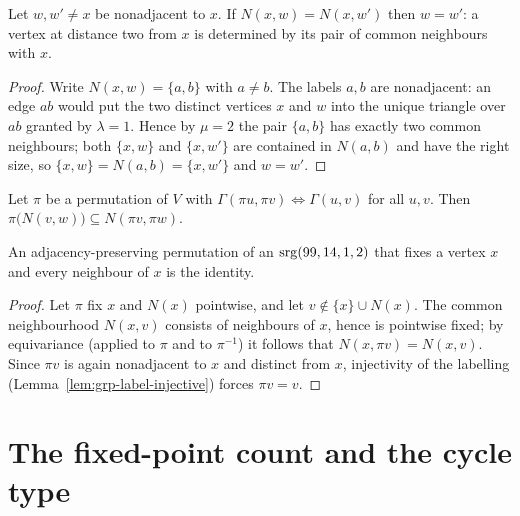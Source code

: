 \begin{lemma}\label{lem:grp-label-injective}
Let $w, w' \ne x$ be nonadjacent to $x$.  If $N(x,w) = N(x,w')$ then
$w = w'$: a vertex at distance two from $x$ is determined by its pair of
common neighbours with $x$.
\leanok
{}
\end{lemma}

\begin{proof}\leanok
{}
Write $N(x,w) = \{a,b\}$ with $a \ne b$.  The labels $a, b$ are nonadjacent:
an edge $ab$ would put the two distinct vertices $x$ and $w$ into the unique
triangle over $ab$ granted by $\lambda = 1$.  Hence by $\mu = 2$ the pair
$\{a,b\}$ has exactly two common neighbours; both $\{x,w\}$ and $\{x,w'\}$
are contained in $N(a,b)$ and have the right size, so
$\{x,w\} = N(a,b) = \{x,w'\}$ and $w = w'$.
\end{proof}

\begin{lemma}\label{lem:grp-equivariance}
Let $\pi$ be a permutation of $V$ with
$\Gamma(\pi u, \pi v) \Leftrightarrow \Gamma(u,v)$ for all $u,v$.  Then
$\pi\bigl(N(v,w)\bigr) \subseteq N(\pi v, \pi w)$.
\leanok
\end{lemma}

\begin{proposition}[Rigidity]\label{lem:grp-rigidity}
An adjacency-preserving permutation of an $\mathrm{srg}(99,14,1,2)$ that fixes a
vertex $x$ and every neighbour of $x$ is the identity.
\leanok
{}
\end{proposition}

\begin{proof}\leanok
{}
Let $\pi$ fix $x$ and $N(x)$ pointwise, and let $v \notin \{x\} \cup N(x)$.
The common neighbourhood $N(x,v)$ consists of neighbours of $x$, hence is
pointwise fixed; by equivariance (applied to $\pi$ and to $\pi^{-1}$) it
follows that $N(x, \pi v) = N(x, v)$.  Since $\pi v$ is again nonadjacent to
$x$ and distinct from $x$, injectivity of the labelling
(Lemma~\ref{lem:grp-label-injective}) forces $\pi v = v$.
\end{proof}

\section{The fixed-point count and the cycle type}

